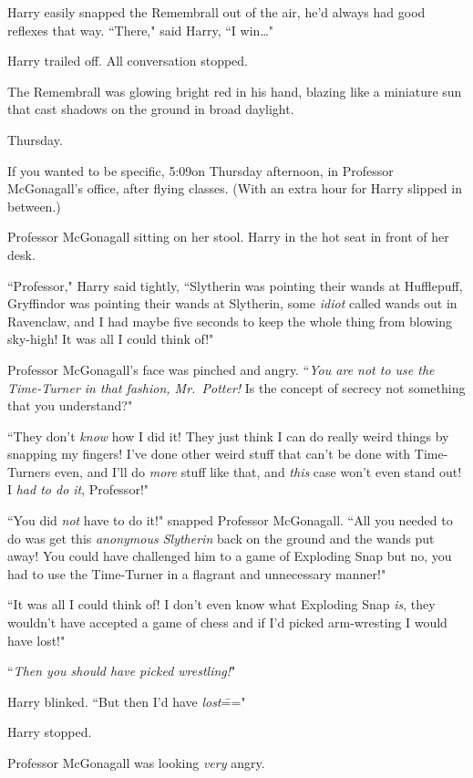 Harry easily snapped the Remembrall out of the air, he'd always had good reflexes that way. ``There," said Harry, ``I win{\ldots}"

Harry trailed off. All conversation stopped.

The Remembrall was glowing bright red in his hand, blazing like a miniature sun that cast shadows on the ground in broad daylight.

\later

Thursday.

If you wanted to be specific, 5:09\pm on Thursday afternoon, in Professor McGonagall's office, after flying classes. (With an extra hour for Harry slipped in between.)

Professor McGonagall sitting on her stool. Harry in the hot seat in front of her desk.

``Professor," Harry said tightly, ``Slytherin was pointing their wands at Hufflepuff, Gryffindor was pointing their wands at Slytherin, some \emph{idiot} called wands out in Ravenclaw, and I had maybe five seconds to keep the whole thing from blowing sky-high! It was all I could think of!"

Professor McGonagall's face was pinched and angry. ``\emph{You are not to use the Time-Turner in that fashion, Mr.~Potter!} Is the concept of secrecy not something that you understand?"

``They don't \emph{know} how I did it! They just think I can do really weird things by snapping my fingers! I've done other weird stuff that can't be done with Time-Turners even, and I'll do \emph{more} stuff like that, and \emph{this} case won't even stand out! I \emph{had to do it}, Professor!"

``You did \emph{not} have to do it!" snapped Professor McGonagall. ``All you needed to do was get this \emph{anonymous Slytherin} back on the ground and the wands put away! You could have challenged him to a game of Exploding Snap but no, you had to use the Time-Turner in a flagrant and unnecessary manner!"

``It was all I could think of! I don't even know what Exploding Snap \emph{is}, they wouldn't have accepted a game of chess and if I'd picked arm-wresting I would have lost!"

``\emph{Then you should have picked wrestling!}"

Harry blinked. ``But then I'd have \emph{lost}\==="

Harry stopped.

Professor McGonagall was looking \emph{very} angry.

